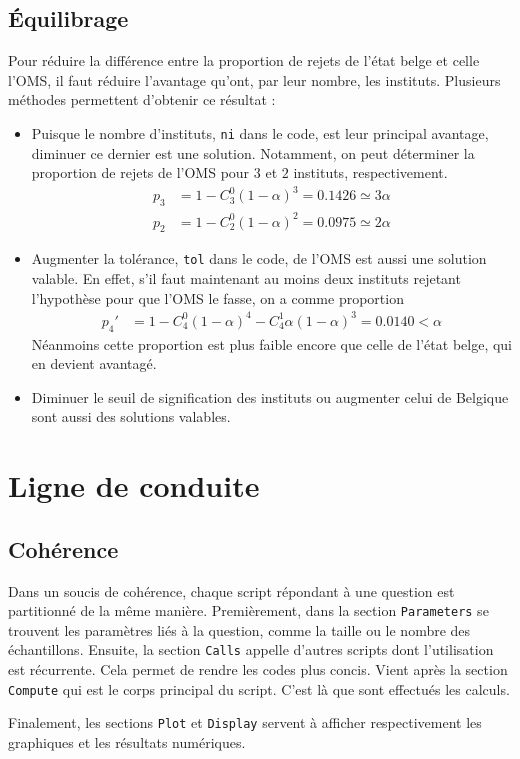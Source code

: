 \documentclass[a4paper, 12pt]{article}
\renewcommand{\thesubsection}{\thesection.\alph{subsection}}
\begin{document}
	\subsection{Équilibrage}
	Pour réduire la différence entre la proportion de rejets de l'état belge et celle l'OMS, il faut réduire l'avantage qu'ont, par leur nombre, les instituts. Plusieurs méthodes permettent d'obtenir ce résultat :
	\begin{itemize}
	    \item Puisque le nombre d'instituts, \texttt{ni} dans le code, est leur principal avantage, diminuer ce dernier est une solution. Notamment, on peut déterminer la proportion de rejets de l'OMS pour $3$ et $2$ instituts, respectivement.
	    \begin{align*}
	        p_3 & = 1 - C^0_3 (1 - \alpha)^{3} = \num{0.1426} \simeq 3 \alpha \\
	        p_2 & = 1 - C^0_2 (1 - \alpha)^{2} = \num{0.0975} \simeq 2 \alpha
	    \end{align*}
	    \item Augmenter la tolérance, \texttt{tol} dans le code, de l'OMS est aussi une solution valable. En effet, s'il faut maintenant au moins deux instituts rejetant l'hypothèse pour que l'OMS le fasse, on a comme proportion
	    \begin{align*}
	        p_4' & = 1 - C^0_4 (1 - \alpha)^{4} - C^1_4 \alpha (1 - \alpha)^{3} = \num{0.0140} < \alpha
	    \end{align*}
	    Néanmoins cette proportion est plus faible encore que celle de l'état belge, qui en devient avantagé.
	    \item Diminuer le seuil de signification des instituts ou augmenter celui de Belgique sont aussi des solutions valables.
	\end{itemize}
	\newpage
	\appendix
	\renewcommand{\thesubsection}{\thesection.\arabic{subsection}}
	\section{Ligne de conduite}
	\subsection{Cohérence} \label{sec:Cohérence}
	Dans un soucis de cohérence, chaque script répondant à une question est partitionné de la même manière. Premièrement, dans la section \texttt{Parameters} se trouvent les paramètres liés à la question, comme la taille ou le nombre des échantillons. Ensuite, la section \texttt{Calls} appelle d'autres scripts dont l'utilisation est récurrente. Cela permet de rendre les codes plus concis. Vient après la section \texttt{Compute} qui est le corps principal du script. C'est là que sont effectués les calculs. \par
	Finalement, les sections \texttt{Plot} et \texttt{Display} servent à afficher respectivement les graphiques et les résultats numériques.
\end{document}
